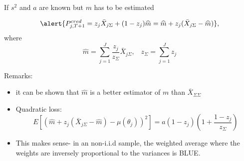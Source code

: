 \documentclass[11pt]{beamer}
\begin{document}
\begin{comment}
\begin{frame}{Accuracy}

In the B{\"u}hlmann-Straub model, the quadratic loss (QL) of the credibility estimator $P_{j,T+1}^{cred}$ is:
$$E[(P_{j,T+1}^{cred}-\mu(\theta_i))^2]=(1-z_j)Var(\mu(\Theta)))
=z_j\frac{E[\sigma^2(\Theta)]}{w_{j\Sigma}}$$
\begin{itemize}
\item the quadratic loss is smaller than  $Var(\mu(\Theta)))$, the QL of the collective premium $m$, ( $m$ is the best estimator without experience data (looking only at collective data)
\item the QL is smaller than $\frac{E[\sigma^2(\Theta)]}{w_{j\Sigma}}$, the QL of $\bar{X}_{j\Sigma}$, which is the best estimator without collective data (looking only at experience data)
    \item The credibility estimator here is the best linear  estimator (QL criterion), given experience and collective data
\end{itemize}

\end{frame}
\end{comment}
\begin{frame}{If $s^2$ and $a$ are known but $m$ has to be estimated}

$$\alert{P_{j,T+1}^{cred}=z_j \bar{X}_{j\Sigma}+(1-z_j)\widehat{m}=\widehat{m}+z_j(\bar{X}_{j\Sigma}-\widehat{m})},$$
where
$$\widehat{m}  =  \sum_{j=1}^J\frac{z_j}{z_\Sigma}\bar{X}_{j\Sigma}, \;\;\; z_\Sigma  =  \sum_{j=1}^J z_j$$

Remarks:
\begin{itemize}
\item it can be shown that $\widehat{m}$ is a better estimator of $m$ than $\bar{X}_{\Sigma\Sigma}$

\item Quadratic loss: $$E[(\widehat{m}+z_j(\bar{X}_{j\Sigma}-\widehat{m})-\mu(\theta_j))^2]=a(1-z_j)\left(1+\frac{1-z_j}{z_\Sigma}\right)$$

\item This makes sense- in an \alert{non-i.i.d} sample, the weighted average where the weights are inversely proportional to the variances is BLUE. 

\end{itemize}

\end{frame}
\end{document}
